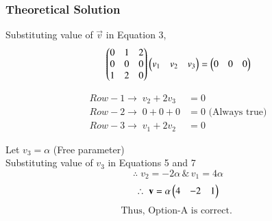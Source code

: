 \documentclass{beamer}
\begin{document}
\begin{frame}[fragile]
\frametitle{Theoretical Solution}
    Substituting value of $\vec{v}$ in Equation 3,
\begin{equation}
   \begin{pmatrix}0 & 1 & 2 \\ 0 & 0 & 0 \\ 1 & 2 & 0\end{pmatrix}\begin{pmatrix}v_1 & v_2 & v_3\end{pmatrix} = \begin{pmatrix}0 & 0 & 0\end{pmatrix} 
\end{equation}

\begin{align}
    Row-1 \rightarrow \; v_2 + 2v_3 &= 0\\
    Row-2 \rightarrow \; 0 + 0 + 0&= 0 \text{ (Always true)}\\
    Row-3 \rightarrow \; v_1 + 2v_2 &= 0
\end{align}

\newpage

Let $v_3 = \alpha$ (Free parameter)\\
Substituting value of $v_3$ in Equations 5 and 7
\begin{equation}
\therefore \; v_2 = -2\alpha \, \&  \, v_1 = 4\alpha  
\end{equation}
\begin{equation}
    \therefore \; \mathbf{v} = \alpha \begin{pmatrix}4 & -2 & 1\end{pmatrix} 
\end{equation}
\begin{align*}
    \boxed{\text{Thus, Option-A is correct. }}
\end{align*}
\end{frame}
\end{document}
